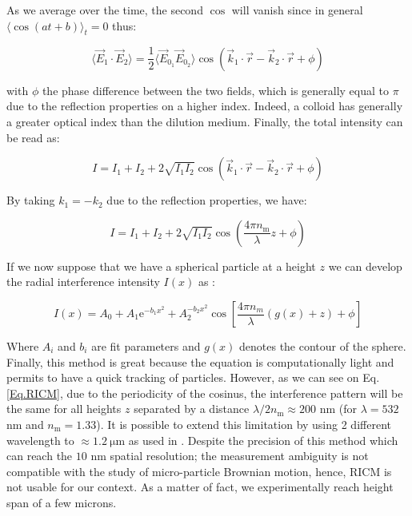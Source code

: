 As we average over the time, the second $\cos$ will vanish since in general $\langle \cos(at + b) \rangle_ t = 0$ thus:

\begin{equation}
	\langle \vec{E}_1 \cdot \vec{E}_2 \rangle = \frac{1}{2} \langle  \vec{E}_{0_1}  \vec{E}_{0_2} \rangle
	\cos 
	\left(
	\vec{k}_1 \cdot \vec{r} - \vec{k}_2 \cdot \vec{r} + \phi	
	\right)	
\end{equation}

with $\phi$ the phase difference between the two fields, which is generally equal to $\pi$ due to the reflection properties on a higher index. Indeed, a colloid has generally a greater optical index than the dilution medium.  Finally, the total intensity can be read as:


\begin{equation}
	I = I_1 + I_2 + 2 \sqrt{I_1 I_2} 
	\cos 
	\left(
	\vec{k}_1 \cdot \vec{r} - \vec{k}_2 \cdot \vec{r} + \phi	
	\right)
\end{equation}

By taking $k_1 = - k_2$ due to the reflection properties, we have:


\begin{equation}
	I = I_1 + I_2 + 2 \sqrt{I_1 I_2} 
	\cos 
	\left(
	\frac{4 \pi n_{\mathrm{m}}}{\lambda} z + \phi	
	\right)
\end{equation}


If we now suppose that we have a spherical particle at a height $z$ we can develop the radial interference intensity $I(x)$ as \cite{ raedler_measurement_1992}:

\begin{equation}
	I(x) = A_0 + A_1 \mathrm{e}^{-b_1 x^2} + A_2^{-b_2 x^2} \cos \left[ \frac{4\pi n_m}{\lambda}\left( g(x) + z \right) + \phi \right]
	\label{Eq.RICM}
\end{equation}

Where $A_i$ and $b_i$ are fit parameters and $g(x)$ denotes the contour of the sphere.
Finally, this method is great because the equation is computationally light and permits to have a quick tracking of particles. However, as we can see on Eq.\ref{Eq.RICM}, due to the periodicity of the cosinus, the interference pattern will be the same for all heights $z$ separated by a distance $\lambda / 2n_\mathrm{m} \approx 200 $ nm (for $\lambda = 532$ nm and $n_{\mathrm{m}} = 1.33$). It is possible to extend this limitation by using 2 different wavelength to $\approx 1.2 ~ \mathrm{\mu m}$ as used in \cite{davies_elastohydrodynamic_2018}. Despite the precision of this method which can reach the $10$ nm spatial resolution; the measurement ambiguity is not compatible with the study of  micro-particle Brownian motion, hence, \gls{RICM} is not usable for our context. As a matter of fact, we experimentally reach height span of a few microns. 



